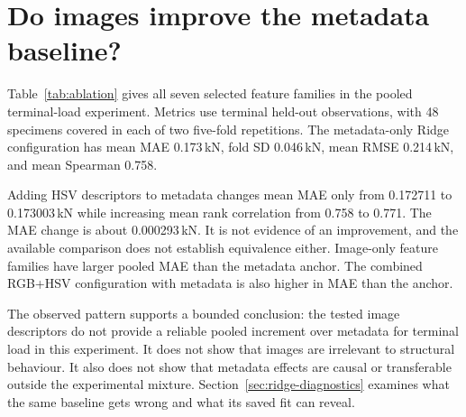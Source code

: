 \section{Do images improve the metadata baseline?}\label{sec:ablation}
Table~\ref{tab:ablation} gives all seven selected feature families in the pooled terminal-load experiment. Metrics use terminal held-out observations, with 48 specimens covered in each of two five-fold repetitions. The metadata-only Ridge configuration has mean MAE 0.173\,kN, fold SD 0.046\,kN, mean RMSE 0.214\,kN, and mean Spearman 0.758.
\begin{table}[htbp]\centering\small
\caption[Pooled terminal-load feature-family results]{Pooled terminal-load comparison for 48 specimens across ten grouped folds. MAE and its sample SD are in kN; $R^2$ and Spearman $\rho$ are arithmetic means of fold metrics. Each feature family shows its selected model, chosen using the same saved folds. The table is an exploratory comparison, not a nested estimate of the model-selection procedure or a significance test.}\label{tab:ablation}

\end{table}
\FloatBarrier
Adding HSV descriptors to metadata changes mean MAE only from 0.172711 to 0.173003\,kN while increasing mean rank correlation from 0.758 to 0.771. The MAE change is about 0.000293\,kN. It is not evidence of an improvement, and the available comparison does not establish equivalence either. Image-only feature families have larger pooled MAE than the metadata anchor. The combined RGB+HSV configuration with metadata is also higher in MAE than the anchor.


The observed pattern supports a bounded conclusion: the tested image descriptors do not provide a reliable pooled increment over metadata for terminal load in this experiment. It does not show that images are irrelevant to structural behaviour. It also does not show that metadata effects are causal or transferable outside the experimental mixture. Section~\ref{sec:ridge-diagnostics} examines what the same baseline gets wrong and what its saved fit can reveal.

